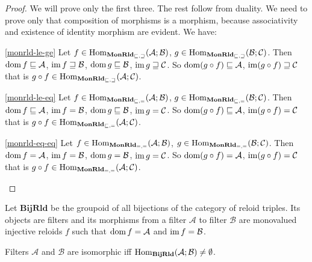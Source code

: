 \begin{proof}
We will prove only the first three. The rest follow from duality.
We need to prove only that composition of morphisms is a morphism,
because associativity and existence of identity morphism are evident.
We have:
\begin{widedisorder}
\item [{\ref{monrld-le-ge}}] Let $f\in\operatorname{Hom}_{\mathbf{MonRld}_{\sqsubseteq,\sqsupseteq}}(\mathcal{A};\mathcal{B})$,
$g\in\operatorname{Hom}_{\mathbf{MonRld}_{\sqsubseteq,\sqsupseteq}}(\mathcal{B};\mathcal{C})$.
Then $\operatorname{dom} f\sqsubseteq\mathcal{A}$, $\operatorname{im} f\sqsupseteq\mathcal{B}$,
$\operatorname{dom} g\sqsubseteq\mathcal{B}$, $\operatorname{im} g\sqsupseteq\mathcal{C}$. So
$\operatorname{dom}(g\circ f)\sqsubseteq\mathcal{A}$, $\operatorname{im}(g\circ f)\sqsupseteq\mathcal{C}$
that is $g\circ f\in\operatorname{Hom}_{\mathbf{MonRld}_{\sqsubseteq,\sqsupseteq}}(\mathcal{A};\mathcal{C})$.
\item [{\ref{monrld-le-eq}}] Let $f\in\operatorname{Hom}_{\mathbf{MonRld}_{\sqsubseteq,=}}(\mathcal{A};\mathcal{B})$,
$g\in\operatorname{Hom}_{\mathbf{MonRld}_{\sqsubseteq,=}}(\mathcal{B};\mathcal{C})$.
Then $\operatorname{dom} f\sqsubseteq\mathcal{A}$, $\operatorname{im} f=\mathcal{B}$, $\operatorname{dom} g\sqsubseteq\mathcal{B}$,
$\operatorname{im} g=\mathcal{C}$. So $\operatorname{dom}(g\circ f)\sqsubseteq\mathcal{A}$,
$\operatorname{im}(g\circ f)=\mathcal{C}$ that is $g\circ f\in\operatorname{Hom}_{\mathbf{MonRld}_{\sqsubseteq,=}}(\mathcal{A};\mathcal{C})$.
\item [{\ref{monrld-eq-eq}}] Let $f\in\operatorname{Hom}_{\mathbf{MonRld}_{=,=}}(\mathcal{A};\mathcal{B})$,
$g\in\operatorname{Hom}_{\mathbf{MonRld}_{=,=}}(\mathcal{B};\mathcal{C})$. Then
$\operatorname{dom} f=\mathcal{A}$, $\operatorname{im} f=\mathcal{B}$, $\operatorname{dom} g=\mathcal{B}$,
$\operatorname{im} g=\mathcal{C}$. So $\operatorname{dom}(g\circ f)=\mathcal{A}$, $\operatorname{im}(g\circ f)=\mathcal{C}$
that is $g\circ f\in\operatorname{Hom}_{\mathbf{MonRld}_{=,=}}(\mathcal{A};\mathcal{C})$.
\end{widedisorder}
\end{proof}
\begin{defn}
Let $\mathbf{BijRld}$ be the groupoid of all bijections of the category
of reloid triples. Its objects are filters and its morphisms from
a filter $\mathcal{A}$ to filter $\mathcal{B}$ are monovalued injective
reloids $f$ such that $\operatorname{dom} f=\mathcal{A}$ and $\operatorname{im} f=\mathcal{B}$.\end{defn}
\begin{thm}
Filters $\mathcal{A}$ and $\mathcal{B}$ are isomorphic iff $\operatorname{Hom}_{\mathbf{BijRld}}(\mathcal{A};\mathcal{B})\neq\emptyset$.\end{thm}
